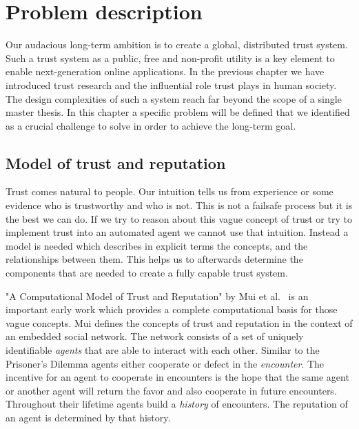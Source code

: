 \chapter{Problem description}
\label{chap:problem}

Our audacious long-term ambition is to create a global, distributed trust system. Such a trust system as a public, free and 
non-profit utility is a key element to enable next-generation online applications. In the 
previous chapter we have introduced trust research and the influential role trust plays in human 
society. The design complexities of such a system reach far beyond the scope of a single 
master thesis. In this chapter a specific problem will be defined that we identified as a crucial
challenge to solve in order to achieve the long-term goal.

\section{Model of trust and reputation}
Trust comes natural to people. Our intuition tells us from experience or some evidence who is 
trustworthy and who is not. This is not a failsafe process but it is the best we can do. If we try
to reason about this vague concept of trust or try to implement trust into an automated agent we
cannot use that intuition. Instead a model is needed which describes in explicit terms the 
concepts, and the relationships between them. This helps us to afterwards determine the components 
that are needed to create a fully capable trust system.

"A Computational Model of Trust and Reputation" by Mui et al.~\cite{mui2002computational} is an
important early work which provides a complete computational basis for those vague concepts. Mui
defines the concepts of trust and reputation in the context of an embedded social network. The 
network consists of a set of uniquely identifiable \textit{agents} that are able to interact with each other. 
Similar to the Prisoner's Dilemma agents either cooperate or defect in the \textit{encounter}. The incentive
for an agent to cooperate in encounters is the hope that the same agent or another agent will
return the favor and also cooperate in future encounters. Throughout their lifetime agents build a 
\textit{history} of encounters. The reputation of an agent is determined by that history. 

